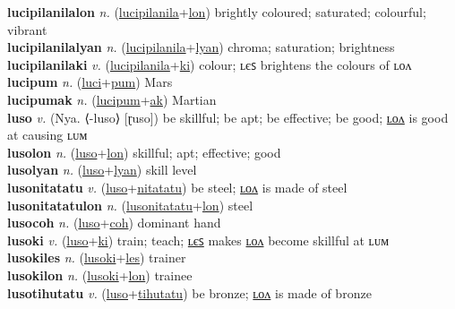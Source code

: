 \textbf{lucipilanilalon} \textit{n.} (\hyperref[lucipilanila]{lucipilanila}+\hyperref[lon]{lon})
brightly coloured; saturated; colourful; vibrant \label{lucipilanilalon} \\
\textbf{lucipilanilalyan} \textit{n.} (\hyperref[lucipilanila]{lucipilanila}+\hyperref[lyan]{lyan})
chroma; saturation; brightness \label{lucipilanilalyan} \\
\textbf{lucipilanilaki} \textit{v.} (\hyperref[lucipilanila]{lucipilanila}+\hyperref[ki]{ki})
colour; ʟєꜱ brightens the colours of ʟᴏᴧ \label{lucipilanilaki} \\
\textbf{lucipum} \textit{n.} (\hyperref[luci]{luci}+\hyperref[pum]{pum})
Mars \label{lucipum} \\
\textbf{lucipumak} \textit{n.} (\hyperref[lucipum]{lucipum}+\hyperref[ak]{ak})
Martian \label{lucipumak} \\
\textbf{luso} \textit{v.} (Nya. ⟨-luso⟩ [ɽuso])
be skillful; be apt; be effective; be good; \hyperref[lusolon]{ʟᴏᴧ} is good at causing ʟᴜᴍ \label{luso} \\
\textbf{lusolon} \textit{n.} (\hyperref[luso]{luso}+\hyperref[lon]{lon})
skillful; apt; effective; good \label{lusolon} \\
\textbf{lusolyan} \textit{n.} (\hyperref[luso]{luso}+\hyperref[lyan]{lyan})
skill level \label{lusolyan} \\
\textbf{lusonitatatu} \textit{v.} (\hyperref[luso]{luso}+\hyperref[nitatatu]{nitatatu})
be steel; \hyperref[lusonitatatulon]{ʟᴏᴧ} is made of steel \label{lusonitatatu} \\
\textbf{lusonitatatulon} \textit{n.} (\hyperref[lusonitatatu]{lusonitatatu}+\hyperref[lon]{lon})
steel \label{lusonitatatulon} \\
\textbf{lusocoh} \textit{n.} (\hyperref[luso]{luso}+\hyperref[coh]{coh})
dominant hand \label{lusocoh} \\
\textbf{lusoki} \textit{v.} (\hyperref[luso]{luso}+\hyperref[ki]{ki})
train; teach; \hyperref[lusokiles]{ʟєꜱ} makes \hyperref[lusokilon]{ʟᴏᴧ} become skillful at ʟᴜᴍ \label{lusoki} \\
\textbf{lusokiles} \textit{n.} (\hyperref[lusoki]{lusoki}+\hyperref[les]{les})
trainer \label{lusokiles} \\
\textbf{lusokilon} \textit{n.} (\hyperref[lusoki]{lusoki}+\hyperref[lon]{lon})
trainee \label{lusokilon} \\
\textbf{lusotihutatu} \textit{v.} (\hyperref[luso]{luso}+\hyperref[tihutatu]{tihutatu})
be bronze; \hyperref[lusotihutatulon]{ʟᴏᴧ} is made of bronze \label{lusotihutatu} \\
